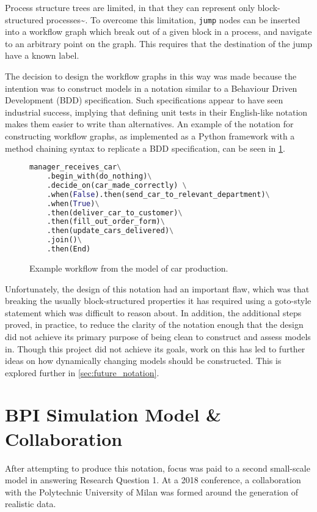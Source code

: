 \documentclass[11pt]{article}
\newcommand{\ampersand}{\&}
\begin{document}
Process structure trees are limited, in that they can represent only
block-structured processes\textasciitilde{}\cite{thesis_process_structure_trees}. To overcome
this limitation, \texttt{jump} nodes can be inserted into a workflow graph which break
out of a given block in a process, and navigate to an arbitrary point on the
graph. This requires that the destination of the jump have a known label.

The decision to design the workflow graphs in this way was made because the
intention was to construct models in a notation similar to a Behaviour Driven
Development (BDD) specification. Such specifications appear to have seen
industrial success, implying that defining unit tests in their English-like
notation makes them easier to write than alternatives. An example of the
notation for constructing workflow graphs, as implemented as a Python framework
with a method chaining syntax to replicate a BDD
specification\cite{wfgraphs_repo}, can be seen in
\cref{fig:wfgraphs_example_code}.


\begin{figure}
\begin{center}
\begin{lstlisting}[language=python]
manager_receives_car\
    .begin_with(do_nothing)\
    .decide_on(car_made_correctly) \
    .when(False).then(send_car_to_relevant_department)\
    .when(True)\
    .then(deliver_car_to_customer)\
    .then(fill_out_order_form)\
    .then(update_cars_delivered)\
    .join()\
    .then(End)
\end{lstlisting}
\end{center}
\caption{Example workflow from the model of car production.}
\label{fig:wfgraphs_example_code}
\end{figure}

Unfortunately, the design of this notation had an important flaw, which was that
breaking the usually block-structured properties it has required using a
goto-style statement which was difficult to reason about. In addition, the
additional steps proved, in practice, to reduce the clarity of the notation
enough that the design did not achieve its primary purpose of being clean to
construct and assess models in. Though this project did not achieve its goals,
work on this has led to further ideas on how dynamically changing models should
be constructed. This is explored further in \cref{sec:future_notation}.

\section{BPI Simulation Model \ampersand{} Collaboration}
\label{sec:org6f83b58}
\label{sec:mattia_model}
After attempting to produce this notation, focus was paid to a second
small-scale model in answering Research Question 1. At a 2018 conference, a
collaboration with the Polytechnic University of Milan was formed around the
generation of realistic data.
\end{document}
